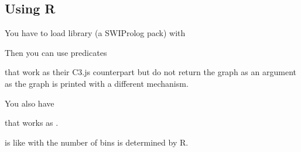 \documentclass[letterpaper,10pt,english]{sphinxmanual}
\begin{document}
\subsection{Using R}
\label{\detokenize{index:using-r}}
\sphinxAtStartPar
You have to load library  (a SWI\sphinxhyphen{}Prolog pack) with

\begin{sphinxVerbatim}[commandchars=\\\{\}]
 
\end{sphinxVerbatim}

\sphinxAtStartPar
Then you can use predicates

\begin{sphinxVerbatim}[commandchars=\\\{\}]
\end{sphinxVerbatim}

\sphinxAtStartPar
that work as their C3.js counterpart but do not return the graph as an argument as the graph is printed with a different mechanism.

\sphinxAtStartPar
You also have

\begin{sphinxVerbatim}[commandchars=\\\{\}]
  
\end{sphinxVerbatim}

\sphinxAtStartPar
that works as .

\begin{sphinxVerbatim}[commandchars=\\\{\}]
  
\end{sphinxVerbatim}

\sphinxAtStartPar
is like  with the number of bins is determined by R.

\begin{sphinxVerbatim}[commandchars=\\\{\}]
  
\end{sphinxVerbatim}
\end{document}
